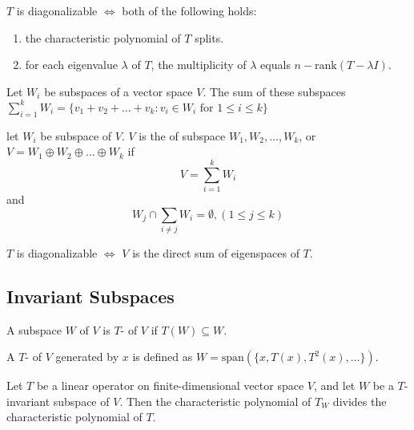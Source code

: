 \begin{theorem}
    $T$ is diagonalizable $\iff$ both of the following holds:
    \begin{enumerate}
        \item the characteristic polynomial of $T$ splits.
        \item for each eigenvalue $\lambda$ of $T$, the multiplicity of $\lambda$ equals $n - \text{rank}(T - \lambda I)$.
    \end{enumerate}
\end{theorem}

\begin{definition}
    Let $W_i$ be subspaces of a vector space $V$. The sum of these subspaces $\sum\limits_{i=1}^k W_i = \{ v_1 + v_2 + \dots + v_k : v_i \in W_i \text{ for } 1 \leq i \leq k \}$
\end{definition}

\begin{definition}
    let $W_i$ be subspace of $V$. $V$ is the  of subspace $W_1, W_2, \dots, W_k$, or $V = W_1 \oplus W_2 \oplus \dots \oplus W_k$ if
    \begin{equation*}
        V = \sum_{i=1}^k W_i
    \end{equation*}
    and 
    \begin{equation*}
        W_j \cap \sum_{i \neq j} W_i = \emptyset, (1 \leq j \leq k)
    \end{equation*}
\end{definition}

\begin{theorem}
    $T$ is diagonalizable $\iff$ $V$ is the direct sum of eigenspaces of $T$.
\end{theorem}


\subsection{Invariant Subspaces}

\begin{definition}
    A subspace $W$ of $V$ is $T$- of $V$ if $T(W) \subseteq W$.
\end{definition}


\begin{definition}
    A $T$- of $V$ generated by $x$ is defined as $W=\text{span}(\{x, T(x), T^2(x), \dots \})$.
\end{definition}

\begin{theorem}
    Let $T$ be a linear operator on finite-dimensional vector space $V$, and let $W$ be a $T$-invariant subspace of $V$. Then the characteristic polynomial of $T_W$ divides the characteristic polynomial of $T$.
\end{theorem}

